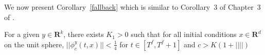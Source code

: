 We now present Corollary~\ref{fallback} which is similar to Corollary~$3$ of Chapter~$3$ of \cite{SA}.
\begin{comment}

\begin{corollary}\label{fallback}
For a given $y$, there exists $c^y_0 >0$ and $T^f >0$ such that for all initial conditions $x$ on the unit sphere, $||\phi^y_c(t,x)|| < \frac{1}{4}$ for $t \in [T^f,T^f+1]$ and $c>c^y_0$.
\end{corollary}
\begin{proof}
See Corollary~$3$, Chapter~$3$ of \cite{SA}.
Choose $T^f$ as in Lemma~\ref{attract}. Now, using equation \eqref{growtheq} with $K$ taken to be the close unit ball, conclude that $||\phi^y_c(t,x)||< \frac{1}{4}$ for $t \in [T^f,T^f+1]$ and $c^y_0$ such that $\epsilon_y(c^y_0)(T^f+1)e^{L(t+1)}<\frac{1}{8}$.
\end{proof}
\begin{lemma}
For a given $y \in \mathbf{R}^k$ and $c^y_0$ as in Corollary~\ref{fallback}, $\exists~K_1 > 0$ such that $c_0(y) \leq K_1(1+||y||)$.
\end{lemma}
\begin{proof}
We need $\epsilon_y(c^y_0)<\epsilon'$, where $\epsilon'=\frac{1}{8(T+1)e^{L(t+1)}}$
\begin{align}\label{cyochoice}
\epsilon_y(c^y_0)&=||h^y_c(\phi_\infty(s,x_0))-h_\infty(\phi_\infty(s,x_0))||\nn\\
	   &=||h^y_c(\phi_\infty(s,x_0)) - h^0_c(\phi_\infty(s,x_0)) + h^0_c(\phi_\infty(s,x_0)) -h_\infty(\phi_\infty(s,x_0))   ||\nn\\
	   &\leq \frac{L||y||}{c_0(y)}+||h^0_c(\phi_\infty(s,x_0))-h_\infty(\phi_\infty(s,x_0))||
\end{align}
By Assumption~\ref{uniconv}, $\exists~c_1$ such that $||h^0_{c_1}(\phi_\infty(s,x_0))-h_\infty(\phi_\infty(s,x_0))|| < \frac{\epsilon'}{2}$. If we choose $c^y_0 > L||y||\frac{2}{\epsilon'}$, then the inequality in \eqref{cyochoice} is satisfied. Proof is complete by choosing $K_1=\max(c_1,L||y||\frac{2}{\epsilon'})$.
\end{proof}
\end{comment}
\begin{corollary}\label{fallback}
For a given $y \in \mathbf{R}^k$, there exists $K_1>0$ such that for all initial conditions $x \in \mathbf{R}^d$ on the unit sphere, $||\phi^y_c(t,x)||<\frac{1}{4}$ for $t \in [T^f,T^f+1]$ and $c> K(1+||||)$
\end{corollary}
